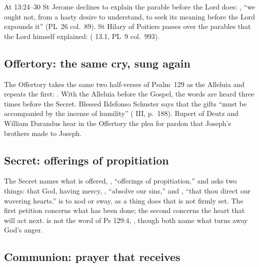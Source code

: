 At 13:24--30 St Jerome declines to explain the parable before the Lord does:
, ``we ought not, from a hasty desire to
understand, to seek its meaning before the Lord expounds it'' (PL~26
col.~89). St Hilary of Poitiers passes over the parables that the Lord himself
explained:  ( 13.1, PL~9 col.~993).

\subsection{Offertory: the same cry, sung again}
\label{sec:element-offertory}

The Offertory takes the same two half-verses of Psalm~129 as the Alleluia and
repeats the first: . With the Alleluia before
the Gospel, the words  are heard three times
before the Secret. Blessed Ildefonso Schuster says that the gifts ``must be
accompanied by the incense of humility'' ( III,
p.~188). Rupert of Deutz and William Durandus hear in the Offertory the plea
for pardon that Joseph's brothers made to Joseph.

\subsection{Secret: offerings of propitiation}
\label{sec:element-secret}

The Secret names what is offered, ,
``offerings of propitiation,'' and asks two things: that God, having mercy,
, ``absolve our sins,'' and
, ``that thou direct our wavering hearts.''
 is to nod or sway, as a thing does that is not firmly set.
The first petition concerns what has been done; the second concerns the
heart that will act next.  is not the word of Ps 129:4,
, though both name what turns away God's anger.

\subsection{Communion: prayer that receives}
\label{sec:element-communion}

